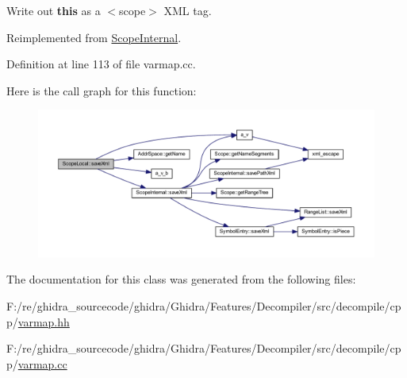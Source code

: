 Write out {\bfseries{this}} as a $<$scope$>$ X\+ML tag. 



Reimplemented from \mbox{\hyperlink{class_scope_internal_af73cb738b4a29cf9aa076ce382ff110f}{Scope\+Internal}}.



Definition at line 113 of file varmap.\+cc.

Here is the call graph for this function\+:
\nopagebreak
\begin{figure}[H]
\begin{center}
\leavevmode
\includegraphics[width=350pt]{class_scope_local_a5ce828992aceb086c5bcc62d8cf2f3ae_cgraph}
\end{center}
\end{figure}


The documentation for this class was generated from the following files\+:\begin{DoxyCompactItemize}
\item 
F\+:/re/ghidra\+\_\+sourcecode/ghidra/\+Ghidra/\+Features/\+Decompiler/src/decompile/cpp/\mbox{\hyperlink{varmap_8hh}{varmap.\+hh}}\item 
F\+:/re/ghidra\+\_\+sourcecode/ghidra/\+Ghidra/\+Features/\+Decompiler/src/decompile/cpp/\mbox{\hyperlink{varmap_8cc}{varmap.\+cc}}\end{DoxyCompactItemize}
